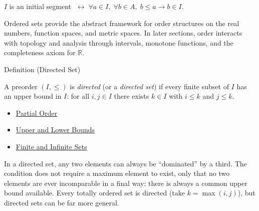 \NoLocalDependencies

\begin{remark*}
$I$ is an initial segment $\;\leftrightarrow\; \forall a \in I,\; \forall b \in A,\; b \leq a \to b \in I$.
\end{remark*}

\begin{remark*}[Transition]
Ordered sets provide the abstract framework for order structures on the real
numbers, function spaces, and metric spaces. In later sections, order
interacts with topology and analysis through intervals, monotone functions,
and the completeness axiom for $\mathbb{R}$.
\end{remark*}


\begin{definitionbox}{Definition (Directed Set)}
\begin{definition}\label{def:directed-set}
A preorder $(I, \leq)$ is \emph{directed} (or a \emph{directed set}) if every
finite subset of $I$ has an upper bound in $I$: for all $i, j \in I$ there
exists $k \in I$ with $i \leq k$ and $j \leq k$.
\end{definition}
\end{definitionbox}

\begin{dependencies}
\begin{itemize}
  \item \hyperref[def:partial-order]{Partial Order}
  \item \hyperref[def:bounds]{Upper and Lower Bounds}
  \item \hyperref[def:finite-infinite]{Finite and Infinite Sets}
\end{itemize}
\end{dependencies}

\begin{remark*}
In a directed set, any two elements can always be ``dominated'' by a third.
The condition does not require a maximum element to exist, only that no two
elements are ever incomparable in a final way: there is always a common
upper bound available. Every totally ordered set is directed (take $k =
\max(i,j)$), but directed sets can be far more general.
\end{remark*}

